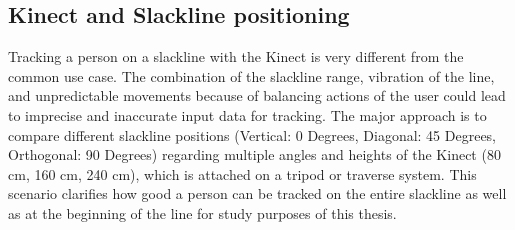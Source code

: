 \subsection{Kinect and Slackline positioning}\label{5_1_technicalFeasibility}
Tracking a person on a slackline with the Kinect is very different from the common use case.
The combination of the slackline range, vibration of the line, and unpredictable movements because of balancing actions of the user could lead to imprecise and inaccurate input data for tracking.
The major approach is to compare different slackline positions (Vertical: 0 Degrees, Diagonal: 45 Degrees, Orthogonal: 90 Degrees) regarding multiple angles and heights of the Kinect (80 cm, 160 cm, 240 cm), which is attached on a tripod or traverse system.
This scenario clarifies how good a person can be tracked on the entire slackline as well as at the beginning of the line for study purposes of this thesis.

